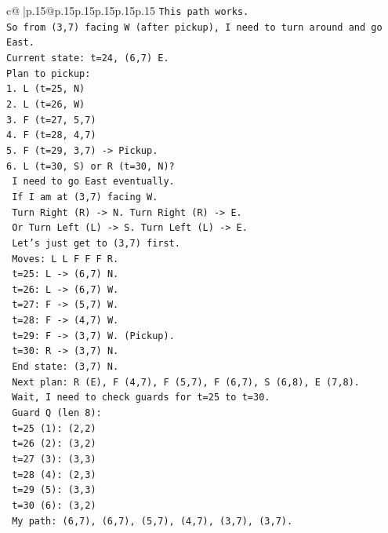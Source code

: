 \documentclass{article}
\begin{document}
{\begin{supertabular}{c@{$\;$}|p{.15\linewidth}@{}p{.15\linewidth}p{.15\linewidth}p{.15\linewidth}p{.15\linewidth}p{.15\linewidth}}
{{{\texttt{This path works.} \\
\texttt{So from (3,7) facing W (after pickup), I need to turn around and go East.} \\
\texttt{Current state: t=24, (6,7) E.} \\
\texttt{Plan to pickup:} \\
\texttt{1. L (t=25, N)} \\
\texttt{2. L (t=26, W)} \\
\texttt{3. F (t=27, 5,7)} \\
\texttt{4. F (t=28, 4,7)} \\
\texttt{5. F (t=29, 3,7) {-}> Pickup.} \\
\texttt{6. L (t=30, S) or R (t=30, N)?} \\
\texttt{   I need to go East eventually.} \\
\texttt{   If I am at (3,7) facing W.} \\
\texttt{   Turn Right (R) {-}> N. Turn Right (R) {-}> E.} \\
\texttt{   Or Turn Left (L) {-}> S. Turn Left (L) {-}> E.} \\
\texttt{   Let's just get to (3,7) first.} \\
\texttt{   Moves: L L F F F R.} \\
\texttt{   t=25: L {-}> (6,7) N.} \\
\texttt{   t=26: L {-}> (6,7) W.} \\
\texttt{   t=27: F {-}> (5,7) W.} \\
\texttt{   t=28: F {-}> (4,7) W.} \\
\texttt{   t=29: F {-}> (3,7) W. (Pickup).} \\
\texttt{   t=30: R {-}> (3,7) N.} \\
\texttt{   End state: (3,7) N.} \\
\texttt{   Next plan: R (E), F (4,7), F (5,7), F (6,7), S (6,8), E (7,8).} \\
\texttt{   Wait, I need to check guards for t=25 to t=30.} \\
\texttt{   Guard Q (len 8):} \\
\texttt{   t=25 (1): (2,2)} \\
\texttt{   t=26 (2): (3,2)} \\
\texttt{   t=27 (3): (3,3)} \\
\texttt{   t=28 (4): (2,3)} \\
\texttt{   t=29 (5): (3,3)} \\
\texttt{   t=30 (6): (3,2)} \\
\texttt{   My path: (6,7), (6,7), (5,7), (4,7), (3,7), (3,7).} \\
}}}
\end{supertabular}}
\end{document}
